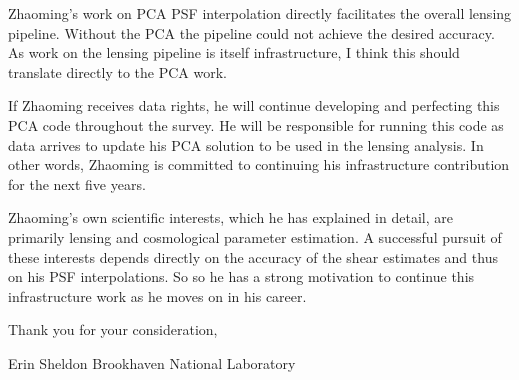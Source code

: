 \documentclass[12pt]{letter}
\begin{document}
Zhaoming's work on PCA PSF interpolation directly facilitates the overall
lensing pipeline.  Without the PCA the pipeline could not achieve the desired
accuracy. As work on the lensing pipeline is itself infrastructure, I think
this should translate directly to the PCA work.  

If Zhaoming receives data rights, he will continue developing and perfecting
this PCA code throughout the survey.  He will be responsible for running this
code as data arrives to update his PCA solution to be used in the lensing
analysis.  In other words, Zhaoming is committed to continuing his
infrastructure contribution for the next five years.

Zhaoming's own scientific interests, which he has explained in detail, are
primarily lensing and cosmological parameter estimation.  A successful pursuit
of these interests depends directly on the accuracy of the shear estimates and
thus on his PSF interpolations.  So so he has a strong motivation to continue
this infrastructure work as he moves on in his career.

Thank you for your consideration,

{\noindent Erin Sheldon}
\newline
{\noindent Brookhaven National Laboratory}
\end{document}
